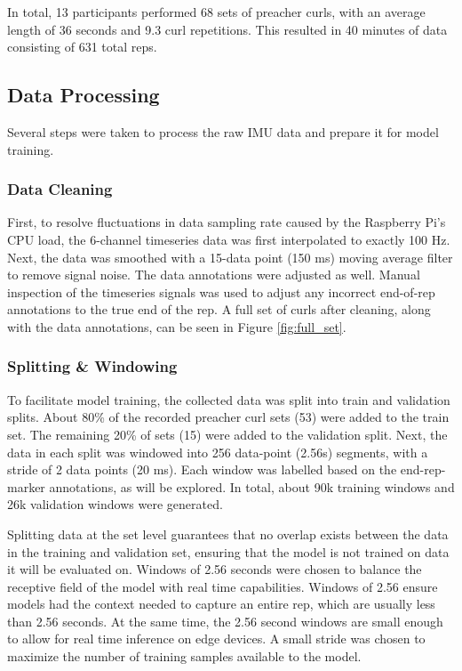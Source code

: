 \documentclass[conference]{IEEEtran}
\begin{document}
In total, 13 participants performed 68 sets of preacher curls, with an average length of 36 seconds and 9.3 curl repetitions. This resulted in 40 minutes of data consisting of 631 total reps.

\subsection{Data Processing}
Several steps were taken to process the raw IMU data and prepare it for model training. 



\subsubsection{Data Cleaning}
First, to resolve fluctuations in data sampling rate caused by the Raspberry Pi's CPU load, the 6-channel timeseries data was first interpolated to exactly 100 Hz. Next, the data was smoothed with a 15-data point (150 ms) moving average filter to remove signal noise. The data annotations were adjusted as well. Manual inspection of the timeseries signals was used to adjust any incorrect end-of-rep annotations to the true end of the rep. A full set of curls after cleaning, along with the data annotations, can be seen in Figure \ref{fig:full_set}.

\subsubsection{Splitting \& Windowing}
To facilitate model training, the collected data was split into train and validation splits. About 80\% of the recorded preacher curl sets (53) were added to the train set. The remaining 20\% of sets (15) were added to the validation split. Next, the data in each split was windowed into 256 data-point (2.56s) segments, with a stride of 2 data points (20 ms). Each window was labelled based on the end-rep-marker annotations, as will be explored. In total, about 90k training windows and 26k validation windows were generated.

Splitting data at the set level guarantees that no overlap exists between the data in the training and validation set, ensuring that the model is not trained on data it will be evaluated on. Windows of 2.56 seconds were chosen to balance the receptive field of the model with real time capabilities. Windows of 2.56 ensure models had the context needed to capture an entire rep, which are usually less than 2.56 seconds. At the same time, the 2.56 second windows are small enough to allow for real time inference on edge devices. A small stride was chosen to maximize the number of training samples available to the model. 
\end{document}
